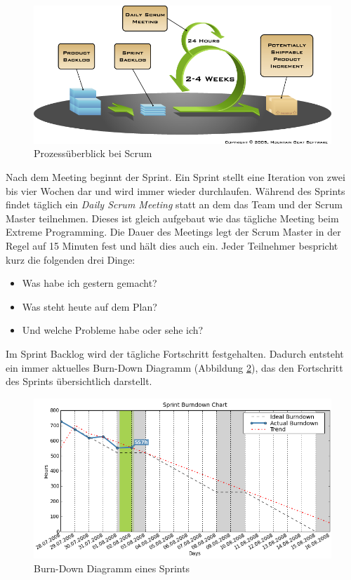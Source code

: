 \begin{figure}[h]
  \centering
  \includegraphics[width=1\textwidth]{images/scrum}
  \caption{Prozessüberblick bei Scrum \cite{bib:mountaingoat}}
  \label{fig:scrum}
\end{figure}

Nach dem Meeting beginnt der Sprint. Ein Sprint stellt eine Iteration von zwei bis vier Wochen dar und wird immer wieder durchlaufen. Während des Sprints findet täglich ein \emph{Daily Scrum Meeting} statt an dem das Team und der Scrum Master teilnehmen. Dieses ist gleich aufgebaut wie das tägliche Meeting beim Extreme Programming. Die Dauer des Meetings legt der Scrum Master in der Regel auf 15 Minuten fest und hält dies auch ein. Jeder Teilnehmer bespricht kurz die folgenden drei Dinge:
\begin{itemize}
  \item Was habe ich gestern gemacht? 
  \item Was steht heute auf dem Plan? 
  \item Und welche Probleme habe oder sehe ich?
\end{itemize}
Im Sprint Backlog wird der tägliche Fortschritt festgehalten. Dadurch entsteht ein immer aktuelles Burn-Down Diagramm (Abbildung \ref{fig:burndown}), das den Fortschritt des Sprints übersichtlich darstellt. 

\begin{figure}[h]
  \centering
  \includegraphics[width=1\textwidth]{images/burndown}
  \caption{Burn-Down Diagramm eines Sprints \cite{bib:agilo}}
  \label{fig:burndown}
\end{figure}

